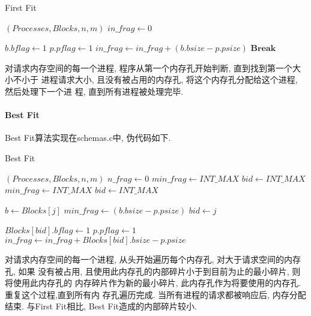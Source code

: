\begin{algorithm}
    \caption{First Fit}\label{alg:firstfit}
    \begin{algorithmic}[1]
        \Require $(Processes, Blocks, n, m)$
        \State $in\_frag \gets 0$

        \State $b.bflag \gets 1$
        \State $p.pflag \gets 1$
        \State $in\_frag \gets in\_frag + (b.bsize - p.psize)$
        \State $\mathbf{Break}$
        \EndIf

        \EndFor
        \EndFor
    \end{algorithmic}
\end{algorithm}

对请求内存空间的每一个进程, 程序从第一个内存孔开始判断, 直到找到第一个大小不小于
进程请求大小, 且没有被占用的内存孔, 将这个内存孔分配给这个进程, 然后处理下一个进
程, 直到所有进程被处理完毕.

\paragraph{Best Fit}
Best Fit算法实现在schemas.c中, 伪代码如下.
\begin{algorithm}
    \caption{Best Fit}\label{fig:bestfit}
    \begin{algorithmic}[1]
        \Require $(Processes, Blocks, n, m)$
        \State $n\_frag \gets 0$
        \State $min\_frag \gets INT\_MAX$
        \State $bid \gets INT\_MAX$
        \State $ min\_frag \gets INT\_MAX $
        \State $bid \gets INT\_MAX$

        \State $b \gets Blocks[j]$
        \State $min\_frag \gets (b.bsize - p.psize)$
        \State $bid \gets j$
        \EndIf
        \EndFor

        \State $Blocks[bid].bflag \gets 1$
        \State $p.pflag \gets 1$
        \State $in\_frag \gets in\_frag + Blocks[bid].bsize - p.psize$
        \EndIf

        \EndFor
    \end{algorithmic}
\end{algorithm}

对请求内存空间的每一个进程, 从头开始遍历每个内存孔, 对大于请求空间的内存孔, 如果
没有被占用, 且使用此内存孔的内部碎片小于到目前为止的最小碎片, 则将使用此内存孔的
内存碎片作为新的最小碎片, 此内存孔作为将要使用的内存孔. 重复这个过程,直到所有内
存孔遍历完成. 当所有进程的请求都被响应后, 内存分配结束. 与First Fit相比, Best
Fit造成的内部碎片较小.

